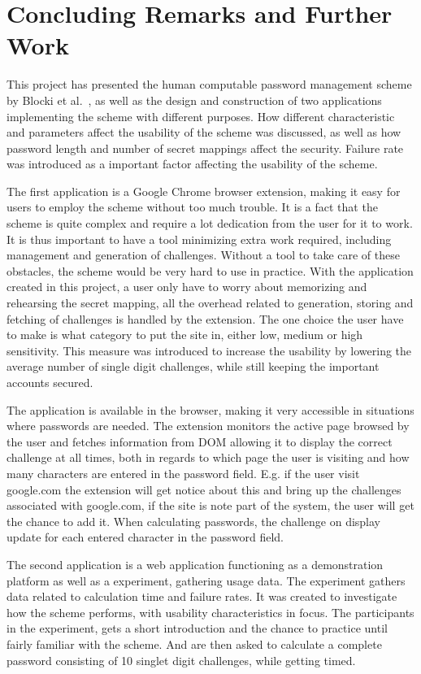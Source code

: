 \chapter{Concluding Remarks and Further Work}
This project has presented the human computable password management scheme by Blocki et al.~\cite{hcp-blocki}, as well as the design and construction of two applications implementing the scheme with different purposes. How different characteristic and parameters affect the usability of the scheme was discussed, as well as how password length and number of secret mappings affect the security. Failure rate was introduced as a important factor affecting the usability of the scheme. 
\par The first application is a Google Chrome browser extension, making it easy for users to employ the scheme without too much trouble. It is a fact that the scheme is quite complex and require a lot dedication from the user for it to work. It is thus important to have a tool minimizing extra work required, including management and generation of challenges. Without a tool to take care of these obstacles, the scheme would be very hard to use in practice. With the application created in this project, a user only have to worry about memorizing and rehearsing the secret mapping, all the overhead related to generation, storing and fetching of challenges is handled by the extension. The one choice the user have to make is what category to put the site in, either low, medium or high sensitivity. This measure was introduced to increase the usability by lowering the average number of single digit challenges, while still keeping the important accounts secured.
\par The application is available in the browser, making it very accessible in situations where passwords are needed. The extension monitors the active page browsed by the user and fetches information from DOM allowing it to display the correct challenge at all times, both in regards to which page the user is visiting and how many characters are entered in the password field. E.g. if the user visit google.com the extension will get notice about this and bring up the challenges associated with google.com, if the site is note part of the system, the user will get the chance to add it. When calculating passwords, the challenge on display update for each entered character in the password field.
\par The second application is a web application functioning as a demonstration platform as well as a experiment, gathering usage data. The experiment gathers data related to calculation time and failure rates. It was created to investigate how the scheme performs, with usability characteristics in focus. The participants in the experiment, gets a short introduction and the chance to practice until fairly familiar with the scheme. And are then asked to calculate a complete password consisting of 10 singlet digit challenges, while getting timed.
